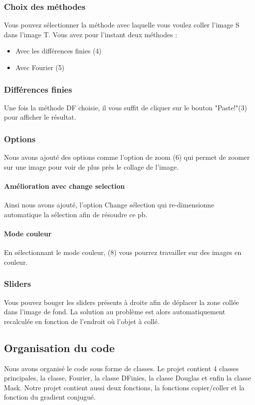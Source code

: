 \subsubsection{Choix des méthodes}
Vous pouvez sélectionner la méthode avec laquelle vous voulez coller l'image S dans l'image T. Vous avez pour l'instant deux méthodes : 
\begin{itemize}
    \item Avec les différences finies (4)
    \item Avec Fourier (5)
\end{itemize}{}

\subsubsection{Différences finies}
Une fois la méthode DF choisie, il vous suffit de cliquer sur le bouton "Paste!"(3)  pour afficher le résultat.
\subsubsection{Options}
Nous avons ajouté des options comme l'option de zoom (6) qui permet de zoomer sur une image pour voir de plus près le collage de l'image. 
\paragraph{ Amélioration avec change selection}
Ainsi nous avons ajouté, l'option Change sélection qui re-dimensionne automatique la sélection afin de résoudre ce pb. 
\paragraph{Mode couleur}
En sélectionnant le mode couleur, (8) vous pourrez travailler sur des images en couleur. 

\subsubsection{Sliders}
Vous pouvez bouger les sliders présents à droite afin de déplacer la zone collée dans l'image de fond. La solution au problème est alors automatiquement recalculée en fonction de l'endroit où l'objet à collé. 

\subsection{Organisation du code}
Nous avons organisé le code sous forme de classes. Le projet contient 4 classes principales, la classe, Fourier, la classe DFinies, la classe Douglas et enfin la classe  Mask. Notre projet contient aussi deux fonctions, la fonctions copier/coller et la fonction du gradient conjugué.

